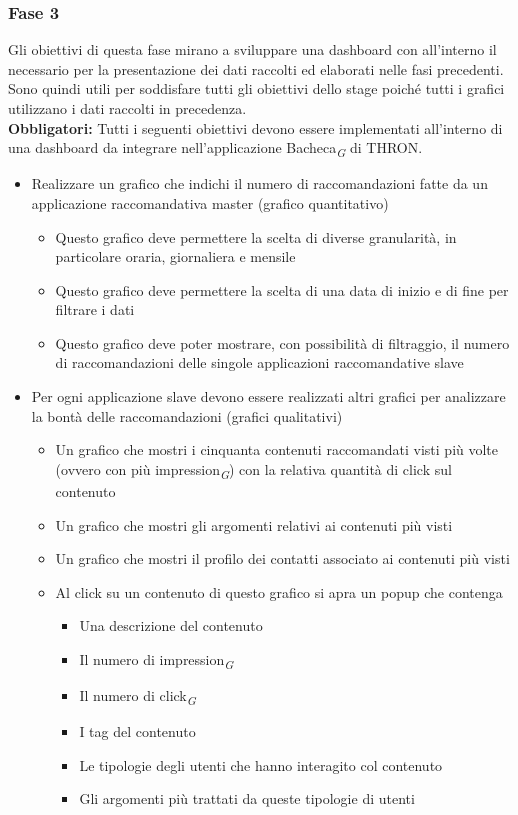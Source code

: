 \documentclass[a4paper, 12pt, twoside, openright]{book}
\newcommand{\gloss}[1]{#1\textsubscript{\textit{\tiny{G}}}}
\begin{document}
\subsubsection{Fase 3}
Gli obiettivi di questa fase mirano a sviluppare una dashboard con all'interno il necessario per la presentazione dei dati raccolti ed elaborati nelle fasi precedenti.\\ Sono quindi utili per soddisfare tutti gli obiettivi dello stage poiché tutti i grafici utilizzano i dati raccolti in precedenza.\\
\textbf{Obbligatori:}
Tutti i seguenti obiettivi devono essere implementati all'interno di una dashboard da integrare nell'applicazione \gloss{Bacheca} di THRON.
\begin{itemize}
	\item Realizzare un grafico che indichi il numero di raccomandazioni fatte da un applicazione raccomandativa master (grafico quantitativo)
	\begin{itemize}
		\item Questo grafico deve permettere la scelta di diverse granularità, in particolare oraria, giornaliera e mensile
		\item Questo grafico deve permettere la scelta di una data di inizio e di fine per filtrare i dati
		\item Questo grafico deve poter mostrare, con possibilità di filtraggio, il numero di raccomandazioni delle singole applicazioni raccomandative slave
	\end{itemize}
	
	\item Per ogni applicazione slave devono essere realizzati altri grafici per analizzare la bontà delle raccomandazioni (grafici qualitativi)
	\begin{itemize}
		\item Un grafico che mostri i cinquanta contenuti raccomandati visti più volte (ovvero con più \gloss{impression}) con la relativa quantità di click sul contenuto 
		\item Un grafico che mostri gli argomenti relativi ai contenuti più visti
		\item Un grafico che mostri il profilo dei contatti associato ai contenuti più visti
		
		\item Al click su un contenuto di questo grafico si apra un popup che contenga 
		\begin{itemize}
			\item Una descrizione del contenuto
			\item Il numero di \gloss{impression}
			\item Il numero di \gloss{click}
			\item I tag del contenuto
			\item Le tipologie degli utenti che hanno interagito col contenuto
			\item Gli argomenti più trattati da queste tipologie di utenti
		\end{itemize} 
	\end{itemize}


\end{itemize}
\end{document}

